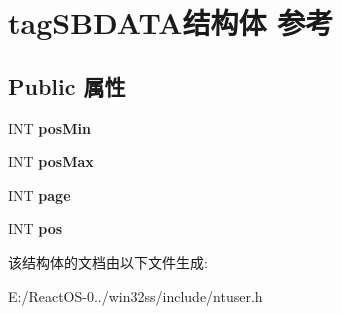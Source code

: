 \hypertarget{structtag_s_b_d_a_t_a}{}\section{tag\+S\+B\+D\+A\+T\+A结构体 参考}
\label{structtag_s_b_d_a_t_a}
\subsection*{Public 属性}
\begin{DoxyCompactItemize}
\item 
\mbox{\label{structtag_s_b_d_a_t_a_a43c0a461f3d282a0ad1701a6becd4b37}} 
I\+NT {\bfseries pos\+Min}
\item 
\mbox{\label{structtag_s_b_d_a_t_a_a22e4b76ed5fac84adbeb283da4245cb7}} 
I\+NT {\bfseries pos\+Max}
\item 
\mbox{\label{structtag_s_b_d_a_t_a_a4c08fc4f66137a8d132078facfc42eff}} 
I\+NT {\bfseries page}
\item 
\mbox{\label{structtag_s_b_d_a_t_a_ac66ed84d695a19484a7dbfc75865d6b6}} 
I\+NT {\bfseries pos}
\end{DoxyCompactItemize}


该结构体的文档由以下文件生成\+:\begin{DoxyCompactItemize}
\item 
E\+:/\+React\+O\+S-\/0../win32ss/include/ntuser.\+h\end{DoxyCompactItemize}

